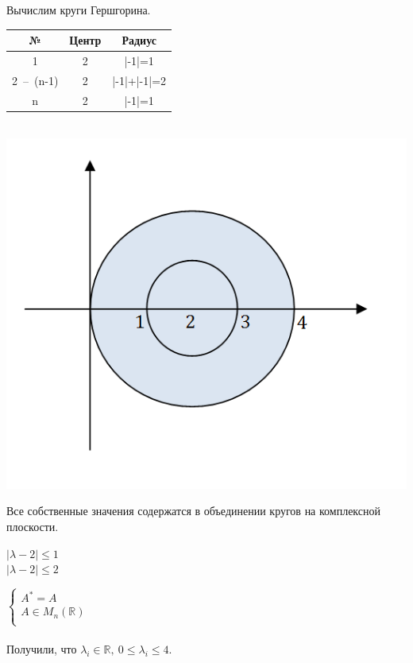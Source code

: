 \documentclass[12pt]{article}
\begin{document}
	Вычислим круги Гершгорина.
	\begin{center}
		\begin{tabular}{|c|c|c|}
			\hline
			№ & Центр & Радиус \\ \hline
			1 & 2 & |-1|=1 \\ \hline
			2~--~(n-1) & 2 & |-1|+|-1|=2 \\ \hline
			n & 2 & |-1|=1 \\ \hline
		\end{tabular}\\
		\includegraphics[scale=0.8]{l9_3.png}
	\end{center}
	Все собственные значения содержатся в объединении кругов на комплексной плоскости.\\
	\begin{center}
		$|\lambda-2|\leqslant 1$\\
		$|\lambda-2|\leqslant 2$
	\end{center}
	$
	\left\{
	\begin{array}{lcl}
	A^*=A \\
	A\in M_n(\mathbb{R}) \\
	\end{array}
	\right.
	$\\ \\
	Получили, что $\lambda_i\in \mathbb{R},~0\leqslant\lambda_i\leqslant 4$.
	
\end{document}
